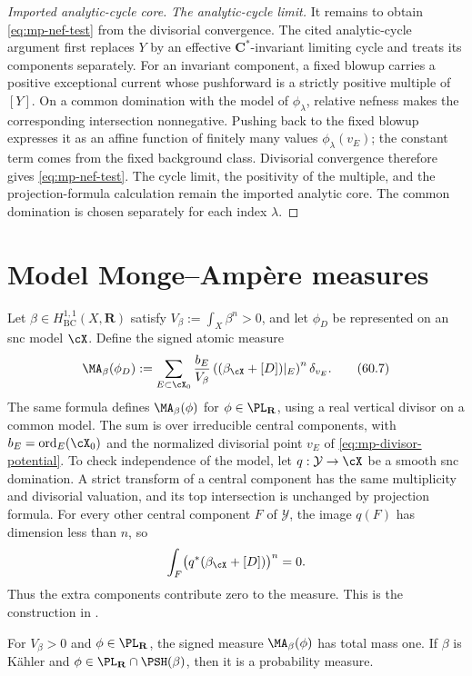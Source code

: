 \begin{proof}[Imported analytic-cycle core]
\emph{The analytic-cycle limit.}
It remains to obtain \eqref{eq:mp-nef-test} from the divisorial convergence.
The cited analytic-cycle argument first replaces $Y$ by an
effective $\mathbf C^*$-invariant limiting cycle and treats its components
separately.  For an invariant component, a fixed blowup carries a positive
exceptional current whose pushforward is a strictly positive multiple of
$[Y]$.  On a common domination with the model of $\phi_\lambda$, relative
nefness makes the corresponding intersection nonnegative.  Pushing back
to the fixed blowup expresses it as an affine function of finitely many
values $\phi_\lambda(v_E)$; the constant term comes from the fixed
background class.  Divisorial convergence therefore gives
\eqref{eq:mp-nef-test}.  The cycle limit, the positivity of the multiple,
and the projection-formula calculation remain the imported analytic core.
The common domination is chosen separately for each index $\lambda$.
\end{proof}

\section{Model Monge--Amp\`ere measures}
\label{sec:mp-psh-model-measures}

Let $\beta\in H^{1,1}_{\mathrm{BC}}(X,\mathbf R)$ satisfy
$V_\beta:=\int_X\beta^n>0$, and let $\phi_D$ be represented on an snc
model $\cX$.  Define the signed atomic measure
\[
 \MA_\beta(\phi_D)
   :=\sum_{E\subset\cX_0}
       \frac{b_E}{V_\beta}
       \left((\beta_{\cX}+[D])|_E\right)^n\delta_{v_E}.
\tag{60.7}\label{eq:mp-model-ma}
\]
The same formula defines $\MA_\beta(\phi)$ for
$\phi\in\PL_{\mathbf R}$, using a real vertical divisor on a common
model. The sum is over irreducible central components, with $b_E=\operatorname{ord}_E(\cX_0)$ and the normalized divisorial point $v_E$ of \eqref{eq:mp-divisor-potential}. To check independence of the
model, let $q:\mathcal Y\to\cX$ be a smooth snc domination.  A strict
transform of a central component has the same multiplicity and divisorial
valuation, and its top intersection is unchanged by projection formula.
For every other central component $F$ of $\mathcal Y$, the image
$q(F)$ has dimension less than $n$, so
\[
 \int_F\bigl(q^*(\beta_{\cX}+[D])\bigr)^n=0.
\]
Thus the extra components contribute zero to the measure.  This is the
construction in \cite[Section~4.2.1, p.~36]{MPTropicalV2}.

\begin{proposition}\label{prop:mp-model-ma-mass}
For $V_\beta>0$ and $\phi\in\PL_{\mathbf R}$, the signed measure
$\MA_\beta(\phi)$ has total mass one.  If $\beta$ is K\"ahler and
$\phi\in\PL_{\mathbf R}\cap\PSH(\beta)$, then it is a probability measure.
\end{proposition}

